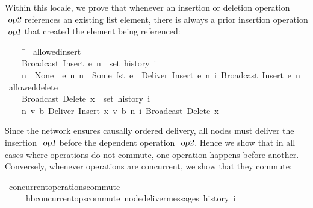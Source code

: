Within this locale, we prove that whenever an insertion or deletion operation $\isa{op2}$ references an existing list element, there is always a prior insertion operation $\isa{op1}$ that created the element being referenced:
\begin{isabelle}
~~~~\ \=\kill
{}\ allowed{\isacharunderscore}insert{\isacharcolon}\\
~~~~\>{\isachardoublequoteopen}Broadcast\ {\isacharparenleft}Insert\ e\ n{\isacharparenright}\ {\isasymin}\ set\ {\isacharparenleft}history\ i{\isacharparenright}{\isachardoublequoteclose}\\
~~~~\>{\isachardoublequoteopen}n\ {\isacharequal}\ None\ {\isasymor}\ {\isacharparenleft}{\isasymexists}e{\isacharprime}\ n{\isacharprime}{\isachardot}\ n\ {\isacharequal}\ Some\ {\isacharparenleft}fst\ e{\isacharprime}{\isacharparenright}\ {\isasymand}\ Deliver\ {\isacharparenleft}Insert\ e{\isacharprime}\ n{\isacharprime}{\isacharparenright}\ {\isasymsqsubset}\isactrlsup i\ Broadcast\ {\isacharparenleft}Insert\ e\ n{\isacharparenright}{\isacharparenright}{\isachardoublequoteclose}\\[4pt]
\ allowed{\isacharunderscore}delete{\isacharcolon}\\
~~~~\>{\isachardoublequoteopen}Broadcast\ {\isacharparenleft}Delete\ x{\isacharparenright}\ {\isasymin}\ set\ {\isacharparenleft}history\ i{\isacharparenright}{\isachardoublequoteclose}\\
~~~~\>{\isachardoublequoteopen}{\isasymexists}n{\isacharprime}\ v\ b{\isachardot}\ Deliver\ {\isacharparenleft}Insert\ {\isacharparenleft}x{\isacharcomma}\ v{\isacharcomma}\ b{\isacharparenright}\ n{\isacharprime}{\isacharparenright}\ {\isasymsqsubset}\isactrlsup i\ Broadcast\ {\isacharparenleft}Delete\ x{\isacharparenright}{\isachardoublequoteclose}
\end{isabelle}
Since the network ensures causally ordered delivery, all nodes must deliver the insertion $\isa{op1}$ before the dependent operation $\isa{op2}$.
Hence we show that in all cases where operations do not commute, one operation happens before another.
Conversely, whenever operations are concurrent, we show that they commute:
\begin{isabelle}
\ concurrent{\isacharunderscore}operations{\isacharunderscore}commute{\isacharcolon}\\
~~~~\ {\isachardoublequoteopen}hb{\isachardot}concurrent{\isacharunderscore}ops{\isacharunderscore}commute\ {\isacharparenleft}node{\isacharunderscore}deliver{\isacharunderscore}messages\ {\isacharparenleft}history\ i{\isacharparenright}{\isacharparenright}{\isachardoublequoteclose}
\end{isabelle}
